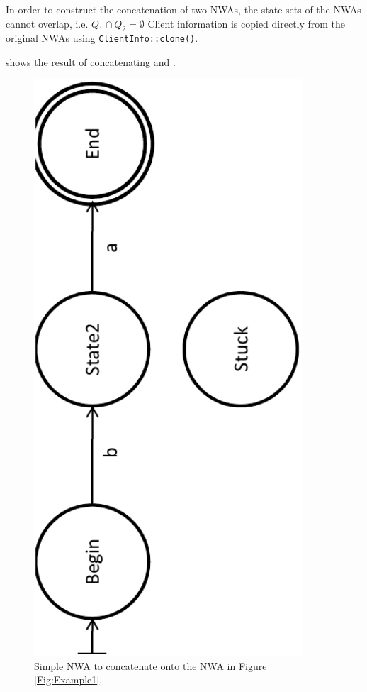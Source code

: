 In
order to construct the concatenation of two NWAs, the state sets of the NWAs
cannot overlap, i.e. $Q_1 \cap Q_2 = \emptyset$
Client information is copied directly from the original NWAs using
\texttt{ClientInfo::clone()}.

 shows the result of concatenating  and
.



\begin{figure}[p]
  \centering
    \includegraphics[width=10cm]{Figures/Figure9}
  \caption{Simple NWA to concatenate onto the NWA in Figure \ref{Fig:Example1}.}
  \label{Fig:Concat1}
\end{figure}

